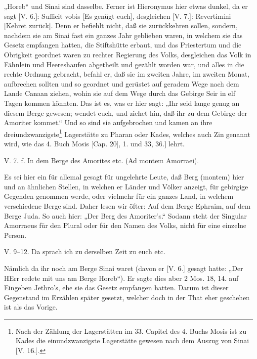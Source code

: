 „Horeb“ und Sinai sind dasselbe. Ferner ist Hieronymus hier etwas dunkel, da er sagt [V. 6.]: Sufficit vobis [Es genügt euch], desgleichen [V. 7.]: Revertimini [Kehret zurück]. Denn er befiehlt nicht, daß sie zurückkehren sollen, sondern, nachdem sie am Sinai fast ein ganzes Jahr geblieben waren, in welchem sie das Gesetz empfangen hatten, die Stiftshütte erbaut, und das Priestertum und die Obrigkeit geordnet waren zu rechter Regierung des Volks, desgleichen das Volk in Fähnlein und Heereshaufen abgetheilt und gezählt worden war, und alles in die rechte Ordnung gebracht, befahl er, daß sie im zweiten Jahre, im zweiten Monat, aufbrechen sollten und so geordnet und gerüstet auf geradem Wege nach dem Lande Canaan ziehen, wohin sie auf dem Wege durch das Gebirge Seir in elf Tagen kommen könnten. Das ist es, was er hier sagt: „Ihr seid lange genug an diesem Berge gewesen; wendet euch, und ziehet hin, daß ihr zu dem Gebirge der Amoriter kommet.“ Und so sind sie aufgebrochen und kamen an ihre dreiundzwanzigste\footnote{Nach der Zählung der Lagerstätten im 33. Capitel des 4. Buchs Mosis ist zu Kades die einundzwanzigste Lagerstätte gewesen nach dem Auszug von Sinai [V. 16.].} Lagerstätte zu Pharan oder Kades, welches auch Zin genannt wird, wie das 4. Buch Mosis [Cap. 20], 1. und 33, 36.] lehrt.

\begin{schriftzitat}
V. 7. f. In dem Berge des Amorites etc. (Ad montem Amorraei).
\end{schriftzitat}

Es sei hier ein für allemal gesagt für ungelehrte Leute, daß Berg (montem) hier und an ähnlichen Stellen, in welchen er Länder und Völker anzeigt, für gebirgige Gegenden genommen werde, oder vielmehr für ein ganzes Land, in welchem verschiedene Berge sind. Daher lesen wir öfter: Auf dem Berge Ephraim, auf dem Berge Juda. So auch hier: „Der Berg des Amoriter’s.“ Sodann steht der Singular Amorraeus für den Plural oder für den Namen des Volks, nicht für eine einzelne Person.

\begin{schriftzitat}
V. 9–12. Da sprach ich zu derselben Zeit zu euch etc.
\end{schriftzitat}

Nämlich da ihr noch am Berge Sinai waret (davon er [V. 6.] gesagt hatte: „Der HErr redete mit uns am Berge Horeb“). Er sagte dies aber 2 Mos. 18, 14. auf Eingeben Jethro’s, ehe sie das Gesetz empfangen hatten. Darum ist dieser Gegenstand im Erzählen später gesetzt, welcher doch in der That eher geschehen ist als das Vorige.

